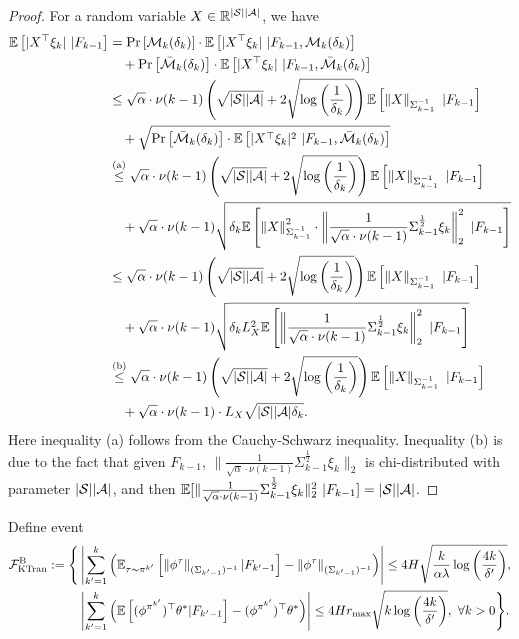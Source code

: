 \begin{proof}
	For a random variable $X \in \mathbb{R}^{|\mathcal{S}| |\mathcal{A}|}$, we have
	\begin{align*}
		\mathbb{E}\left[ |X^\top \xi_k| \ | F_{k-1} \right] &= \Pr\left[  \mathcal{M}_k(\delta_k)  \right] \cdot \mathbb{E}\left[ |X^\top \xi_k| \ | F_{k-1}, \mathcal{M}_k(\delta_k) \right] \\& \quad + \Pr\left[  \bar{\mathcal{M}}_k(\delta_k)  \right] \cdot  \mathbb{E}\left[ |X^\top \xi_k| \ | F_{k-1}, \bar{\mathcal{M}}_k(\delta_k)  \right]
		\\
		&\leq \sqrt{\alpha} \cdot \nu(k-1) \left(  \sqrt{|\mathcal{S}||\mathcal{A}|} + 2 \sqrt{\log\left( \frac{1}{\delta_k} \right)}  \right) \mathbb{E}\left[  \left\| X \right\|_{\Sigma_{k-1}^{-1}} \ | F_{k-1} \right] 
		\\
		&\quad + \sqrt{\Pr\left[  \bar{\mathcal{M}}_k(\delta_k)  \right] \cdot  \mathbb{E}\left[ |X^\top \xi_k|^2 \ | F_{k-1}, \bar{\mathcal{M}}_k(\delta_k) \right] }
		\\
		&\overset{\textup{(a)}}{\leq} \sqrt{\alpha} \cdot \nu(k-1) \left(  \sqrt{|\mathcal{S}||\mathcal{A}|} + 2 \sqrt{\log\left( \frac{1}{\delta_k} \right)}  \right) \mathbb{E}\left[  \left\| X \right\|_{\Sigma_{k-1}^{-1}} \ | F_{k-1} \right] 
		\\
		&\quad + \sqrt{\alpha} \cdot \nu(k-1) \sqrt{ \delta_k  \mathbb{E}\left[  \left\| X \right\|^2_{\Sigma_{k-1}^{-1}} \cdot \left\| \frac{1}{\sqrt{\alpha} \cdot \nu(k-1)} \Sigma_{k-1}^{\frac{1}{2}} \xi_k \right\|_2^2 \ | F_{k-1} \right]  }
				\\
		&\leq \sqrt{\alpha} \cdot \nu(k-1) \left(  \sqrt{|\mathcal{S}||\mathcal{A}|} + 2 \sqrt{\log\left( \frac{1}{\delta_k} \right)}  \right) \mathbb{E}\left[  \left\| X \right\|_{\Sigma_{k-1}^{-1}} \ | F_{k-1} \right] 
		\\
		&\quad + \sqrt{\alpha} \cdot \nu(k-1) \sqrt{ \delta_k L_{X}^2 \mathbb{E}\left[   \left\| \frac{1}{\sqrt{\alpha} \cdot \nu(k-1)} \Sigma_{k-1}^{\frac{1}{2}} \xi_k \right\|_2^2 \ | F_{k-1} \right]  }
		\\
		&\overset{\textup{(b)}}{\leq} \sqrt{\alpha} \cdot \nu(k-1) \left(  \sqrt{|\mathcal{S}||\mathcal{A}|} + 2 \sqrt{\log\left( \frac{1}{\delta_k} \right)}  \right) \mathbb{E}\left[  \left\| X \right\|_{\Sigma_{k-1}^{-1}} \ | F_{k-1} \right] 
		\\
		&\quad + \sqrt{\alpha} \cdot \nu(k-1) \cdot L_{X} \sqrt{ |\mathcal{S}| |\mathcal{A}| \delta_k }  .
	\end{align*}
	Here inequality (a) follows from the Cauchy-Schwarz inequality. Inequality (b) is due to the fact that given $F_{k-1}$, $\|\frac{1}{\sqrt{\alpha} \cdot \nu(k-1)} \Sigma_{k-1}^{\frac{1}{2}} \xi_k\|_2$ is chi-distributed with parameter $|\mathcal{S}| |\mathcal{A}|$, and then $\mathbb{E}[ \|\frac{1}{\sqrt{\alpha} \cdot \nu(k-1)} \Sigma_{k-1}^{\frac{1}{2}} \xi_k\|_2^2 \ | F_{k-1}] = |\mathcal{S}| |\mathcal{A}|$.
\end{proof}

Define event 
\begin{align}
	\mathcal{F}^{\textup{B}}_{\textup{KTran}}:=\Bigg\{& \left| \sum_{k'=1}^{k} \left(  \mathbb{E}_{\tau \sim \pi^{k'}}\left[  \left\|  \phi^{\tau} \right\|_{(\Sigma_{k'-1})^{-1}} | F_{k'-1} \right] - \left\|  \phi^{\tau} \right\|_{(\Sigma_{k'-1})^{-1}}  \right)  \right| \leq 4H\sqrt{ \frac{k}{\alpha \lambda} \log\left( \frac{4k}{\delta'} \right) } ,
	\nonumber\\
	&\left| \sum_{k'=1}^{k} \left(  \mathbb{E}\left[  (\phi^{\pi^{k'}})^\top \theta^* | F_{k'-1}  \right] - (\phi^{\pi^{k'}})^\top \theta^*  \right) \right| \leq 4 H r_{\max} \sqrt{ k \log\left( \frac{4k}{\delta'} \right) } ,\ \forall k>0 \Bigg\} .
\end{align}

